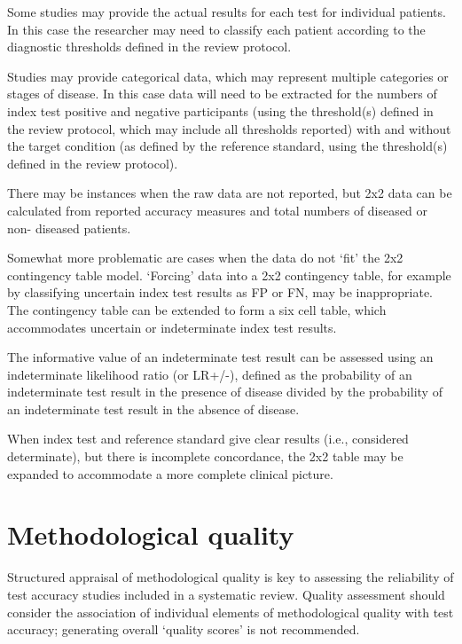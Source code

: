 \documentclass[
  11pt,
  a4paper,
  DIV=11,
  numbers=noendperiod]{scrreprt}
\begin{document}
Some studies may provide the actual results for each test for individual
patients. In this case the researcher may need to classify each patient
according to the diagnostic thresholds defined in the review protocol.

Studies may provide categorical data, which may represent multiple
categories or stages of disease. In this case data will need to be
extracted for the numbers of index test positive and negative
participants (using the threshold(s) defined in the review protocol,
which may include all thresholds reported) with and without the target
condition (as defined by the reference standard, using the threshold(s)
defined in the review protocol).

There may be instances when the raw data are not reported, but 2x2 data
can be calculated from reported accuracy measures and total numbers of
diseased or non- diseased patients.

Somewhat more problematic are cases when the data do not `fit' the 2x2
contingency table model. `Forcing' data into a 2x2 contingency table,
for example by classifying uncertain index test results as FP or FN, may
be inappropriate. The contingency table can be extended to form a six
cell table, which accommodates uncertain or indeterminate index test
results.

The informative value of an indeterminate test result can be assessed
using an indeterminate likelihood ratio (or LR+/-), defined as the
probability of an indeterminate test result in the presence of disease
divided by the probability of an indeterminate test result in the
absence of disease.

When index test and reference standard give clear results (i.e.,
considered determinate), but there is incomplete concordance, the 2x2
table may be expanded to accommodate a more complete clinical picture.

\section{Methodological quality}\label{methodological-quality}

Structured appraisal of methodological quality is key to assessing the
reliability of test accuracy studies included in a systematic review.
Quality assessment should consider the association of individual
elements of methodological quality with test accuracy; generating
overall `quality scores' is not recommended.
\end{document}
